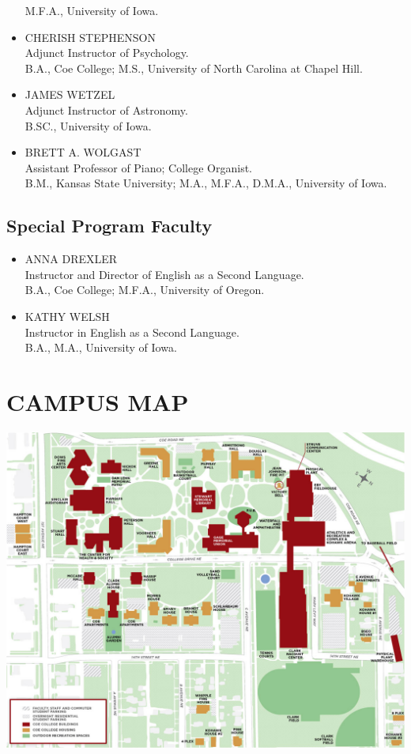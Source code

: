 \documentclass[
  letterpaper,
]{scrbook}
\begin{document}
\begin{itemize}
  M.F.A., University of Iowa.
\item
  CHERISH STEPHENSON\\
  Adjunct Instructor of Psychology.\\
  B.A., Coe College; M.S., University of North Carolina at Chapel Hill.
\item
  JAMES WETZEL\\
  Adjunct Instructor of Astronomy.\\
  B.SC., University of Iowa.
\item
  BRETT A. WOLGAST\\
  Assistant Professor of Piano; College Organist.\\
  B.M., Kansas State University; M.A., M.F.A., D.M.A., University of
  Iowa.
\end{itemize}

\subsection{Special Program Faculty}\label{special-program-faculty}

\begin{itemize}
\item
  ANNA DREXLER\\
  Instructor and Director of English as a Second Language.\\
  B.A., Coe College; M.F.A., University of Oregon.
\item
  KATHY WELSH\\
  Instructor in English as a Second Language.\\
  B.A., M.A., University of Iowa.
\end{itemize}

\section{CAMPUS MAP}\label{sec-campus-map}

\begin{center}
\includegraphics{catalog_sections/graphics/Campus-Map_full-screen.jpg}
\end{center}
\end{document}
